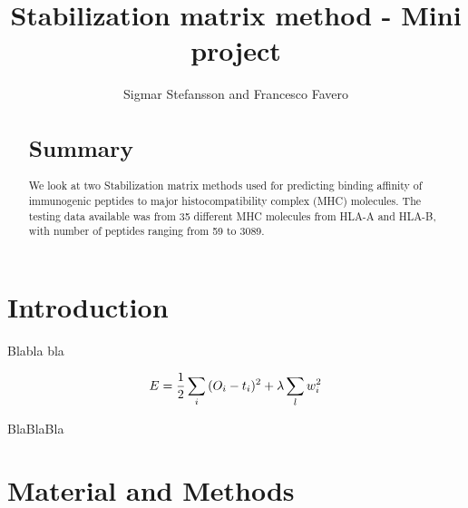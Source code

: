 \documentclass{bioinfo}
\begin{document}
\begin{application}

\title[SMM Project]{Stabilization matrix method - Mini project}
\author[Sigmar Stefansson, Francesco Favero]{Sigmar Stefansson and Francesco Favero}
\address{Danmarks Tekniske Univeristet}



\maketitle

\begin{abstract}

\section{Summary}
We look at two Stabilization matrix methods \cite{SMM} used for predicting binding affinity of immunogenic peptides to major histocompatibility complex \cite{wiki:MHC} (MHC) molecules.
The testing data available was from 35 different MHC molecules from HLA-A and HLA-B, with number of peptides ranging from 59 to 3089.

\end{abstract}

\section*{Introduction}


Blabla bla

\begin{equation}
\begin{centering}
\label{eq:general}
E = \frac{1}{2} \sum_i{(O_i-t_i)^2} + \lambda \sum_l{w_i^2}
\end{centering}
\end{equation}

BlaBlaBla
\section*{Material and Methods}


\end{application}
\end{document}
